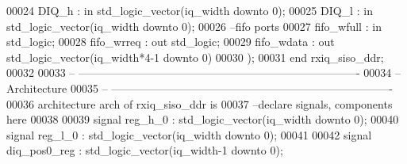 \begin{DoxyCode}
00024       \textcolor{vhdlchar}{DIQ_h}         \textcolor{vhdlchar}{:} \textcolor{keywordflow}{in} \textcolor{comment}{std\_logic\_vector}\textcolor{vhdlchar}{(}\textcolor{vhdlchar}{iq_width} \textcolor{keywordflow}{downto} \textcolor{vhdllogic}{}\textcolor{vhdllogic}{0}\textcolor{vhdlchar}{)};
00025         \textcolor{vhdlchar}{DIQ_l}          \textcolor{vhdlchar}{:} \textcolor{keywordflow}{in} \textcolor{comment}{std\_logic\_vector}\textcolor{vhdlchar}{(}\textcolor{vhdlchar}{iq_width} \textcolor{keywordflow}{downto} \textcolor{vhdllogic}{}\textcolor{vhdllogic}{0}\textcolor{vhdlchar}{)};
00026 \textcolor{keyword}{      --fifo ports }
00027       \textcolor{vhdlchar}{fifo_wfull}  \textcolor{vhdlchar}{:} \textcolor{keywordflow}{in} \textcolor{comment}{std\_logic};
00028       \textcolor{vhdlchar}{fifo_wrreq}  \textcolor{vhdlchar}{:} \textcolor{keywordflow}{out} \textcolor{comment}{std\_logic};
00029       \textcolor{vhdlchar}{fifo_wdata}  \textcolor{vhdlchar}{:} \textcolor{keywordflow}{out} \textcolor{comment}{std\_logic\_vector}\textcolor{vhdlchar}{(}\textcolor{vhdlchar}{iq_width}\textcolor{vhdlchar}{*}\textcolor{vhdllogic}{4-1} \textcolor{keywordflow}{downto} \textcolor{vhdllogic}{}\textcolor{vhdllogic}{0}\textcolor{vhdlchar}{)}   
00030         \textcolor{vhdlchar}{)};
00031 \textcolor{keywordflow}{end} \textcolor{vhdlchar}{rxiq\_siso\_ddr};
00032 
00033 \textcolor{keyword}{-- ----------------------------------------------------------------------------}
00034 \textcolor{keyword}{-- Architecture}
00035 \textcolor{keyword}{-- ----------------------------------------------------------------------------}
00036 \textcolor{keywordflow}{architecture} arch \textcolor{keywordflow}{of} rxiq_siso_ddr is
00037 \textcolor{keyword}{--declare signals,  components here}
00038 
00039 \textcolor{keywordflow}{signal} \textcolor{vhdlchar}{reg_h_0}             \textcolor{vhdlchar}{:} \textcolor{comment}{std\_logic\_vector}\textcolor{vhdlchar}{(}\textcolor{vhdlchar}{iq_width} \textcolor{keywordflow}{downto} \textcolor{vhdllogic}{}\textcolor{vhdllogic}{0}\textcolor{vhdlchar}{)};
00040 \textcolor{keywordflow}{signal} \textcolor{vhdlchar}{reg_l_0}             \textcolor{vhdlchar}{:} \textcolor{comment}{std\_logic\_vector}\textcolor{vhdlchar}{(}\textcolor{vhdlchar}{iq_width} \textcolor{keywordflow}{downto} \textcolor{vhdllogic}{}\textcolor{vhdllogic}{0}\textcolor{vhdlchar}{)};
00041 
00042 \textcolor{keywordflow}{signal} \textcolor{vhdlchar}{diq_pos0_reg}         \textcolor{vhdlchar}{:} \textcolor{comment}{std\_logic\_vector}\textcolor{vhdlchar}{(}\textcolor{vhdlchar}{iq_width}\textcolor{vhdlchar}{-}\textcolor{vhdllogic}{}\textcolor{vhdllogic}{1} \textcolor{keywordflow}{downto} \textcolor{vhdllogic}{}\textcolor{vhdllogic}{0}\textcolor{vhdlchar}{)};

\end{DoxyCode}
